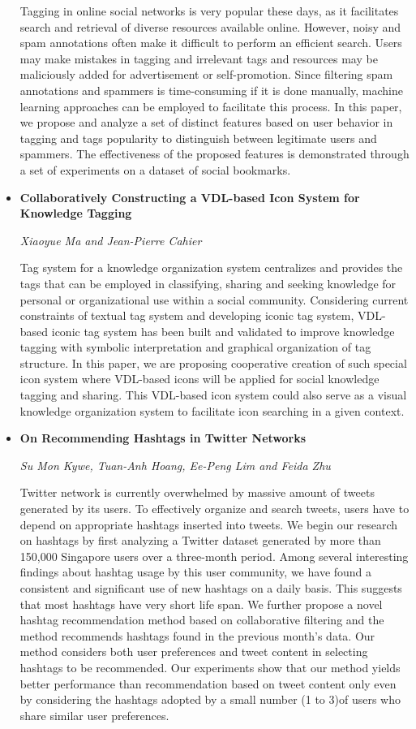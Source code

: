 \begin{itemize}
Tagging in online social networks is very popular these days, as it facilitates
search and retrieval of diverse resources available online. However, noisy and
spam annotations often make it difficult to perform an efficient search. Users
may make mistakes in tagging and irrelevant tags and resources may be
maliciously added for advertisement or self-promotion. Since filtering spam
annotations and spammers is time-consuming if it is done manually, machine
learning approaches can be employed to facilitate this process. In this paper,
we propose and analyze a set of distinct features based on user behavior in
tagging and tags popularity to distinguish between legitimate users and
spammers. The effectiveness of the proposed features is demonstrated through a
set of experiments on a dataset of social bookmarks.


\item \textbf{Collaboratively Constructing a VDL-based Icon System for Knowledge
Tagging}

\textit{Xiaoyue Ma and Jean-Pierre Cahier}

Tag system for a knowledge organization system centralizes and provides the tags
that can be employed in classifying, sharing and seeking knowledge for personal
or organizational use within a social community. Considering current constraints
of textual tag system and developing iconic tag system, VDL-based iconic tag
system has been built and validated to improve knowledge tagging with symbolic
interpretation and graphical organization of tag structure. In this paper, we
are proposing cooperative creation of such special icon system where VDL-based
icons will be applied for social knowledge tagging and sharing. This VDL-based
icon system could also serve as a visual knowledge organization system to
facilitate icon searching in a given context.

\item \textbf{On Recommending Hashtags in Twitter Networks}

\textit{Su Mon Kywe, Tuan-Anh Hoang, Ee-Peng Lim and Feida Zhu}

Twitter network is currently overwhelmed by massive amount of tweets generated
by its users. To effectively organize and search tweets, users have to depend on
appropriate hashtags inserted into tweets. We begin our research on hashtags by
first analyzing a Twitter dataset generated by more than 150,000 Singapore users
over a three-month period. Among several interesting findings about hashtag
usage by this user community, we have found a consistent and significant use of
new hashtags on a daily basis. This suggests that most hashtags have very short
life span. We further propose a novel hashtag recommendation method based on
collaborative filtering and the method recommends hashtags found in the previous
month's data. Our method considers both user preferences and tweet content in
selecting hashtags to be recommended. Our experiments show that our method
yields better performance than recommendation based on tweet content only even
by considering the hashtags adopted by a small number (1 to 3)of users who share
similar user preferences.


\end{itemize}
